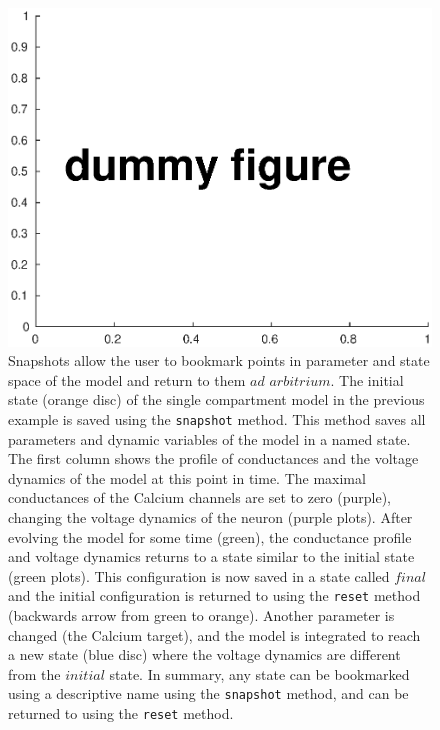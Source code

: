 \documentclass{frontiersSCNS} %
\begin{document}
\begin{figure}[!htb]
	\centering
	\includegraphics[width=1.0\linewidth]{gfx/figure_snapshot}
	\caption{Snapshots allow the user to bookmark points in parameter and state space of the model and return to them $ad$   $arbitrium$. The initial state (orange disc) of the single compartment model in the previous example is saved using the \texttt{snapshot} method. This method saves all parameters and dynamic variables of the model in a named state. The first column shows the profile of conductances and the voltage dynamics of the model at this point in time. The maximal conductances of the Calcium channels are set to zero (purple), changing the voltage dynamics of the neuron (purple plots). After evolving the model for some time (green), the conductance profile and voltage dynamics returns to a state similar to the initial state (green plots). This configuration is now saved in a state called $final$ and the initial configuration is returned to using the \texttt{reset} method (backwards arrow from green to orange). Another parameter is changed (the Calcium target), and the model is integrated to reach a new state (blue disc) where the voltage dynamics are different from the $initial$ state. In summary, any state can be bookmarked using a descriptive name using the \texttt{snapshot} method, and can be returned to using the \texttt{reset} method.}
	\label{fig:figuresnapshot}
\end{figure}
\end{document}
